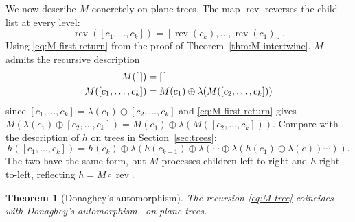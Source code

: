 \documentclass[a4paper,11pt]{article}
\newtheorem{theorem}{Theorem}[section]
\theoremstyle{definition}
\DeclareMathOperator{\rev}{rev}
\begin{document}
We now describe $M$ concretely on plane trees.
The map $\rev$ reverses the child list at
every level:
\[
  \rev([c_1, \ldots, c_k])
    = [\rev(c_k), \ldots, \rev(c_1)].
\]
Using \eqref{eq:M-first-return} from the proof of Theorem~\ref{thm:M-intertwine}, $M$ admits the
recursive description
\begin{align}\label{eq:M-tree}
  M([\,]) &= [\,] \notag\\
  M([c_1, \ldots, c_k])
    &= M(c_1) \oplus \lambda(M([c_2, \ldots, c_k]))
\end{align}
since $[c_1, \ldots, c_k] = \lambda(c_1) \oplus
[c_2, \ldots, c_k]$ and
\eqref{eq:M-first-return} gives
$M(\lambda(c_1) \oplus [c_2, \ldots, c_k])
= M(c_1) \oplus \lambda(M([c_2, \ldots, c_k]))$.
Compare with the description of $h$ on trees
in Section~\ref{sec:trees}:
\[
  h([c_1, \ldots, c_k])
    = h(c_k) \oplus \lambda(h(c_{k-1}) \oplus
      \lambda(\cdots \oplus \lambda(h(c_1)
      \oplus \lambda(e)) \cdots)).
\]
The two have the same form, but $M$ processes children
left-to-right and $h$ right-to-left, reflecting
$h = M \circ \rev$.

\begin{theorem}[Donaghey's automorphism]\label{thm:donaghey}
The recursion \eqref{eq:M-tree} coincides with
Donaghey's automorphism~\cite{Donaghey80} on plane
trees.
\end{theorem}
\end{document}
